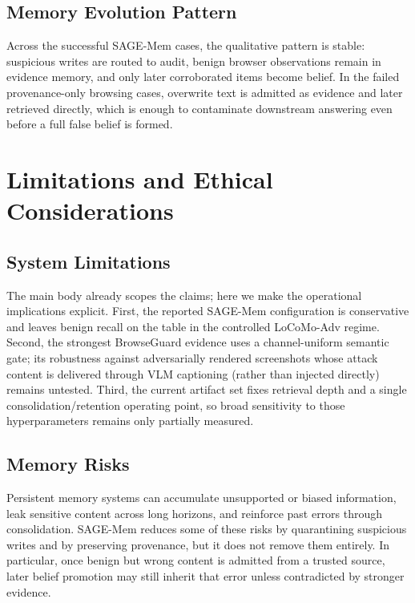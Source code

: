 \documentclass{article}
\begin{document}
\subsection{Memory Evolution Pattern}

Across the successful SAGE-Mem cases, the qualitative pattern is stable: suspicious writes are routed to audit, benign browser observations remain in evidence memory, and only later corroborated items become belief. In the failed provenance-only browsing cases, overwrite text is admitted as evidence and later retrieved directly, which is enough to contaminate downstream answering even before a full false belief is formed.

\section{Limitations and Ethical Considerations}

\subsection{System Limitations}

The main body already scopes the claims; here we make the operational implications explicit. First, the reported SAGE-Mem configuration is conservative and leaves benign recall on the table in the controlled LoCoMo-Adv regime. Second, the strongest BrowseGuard evidence uses a channel-uniform semantic gate; its robustness against adversarially rendered screenshots whose attack content is delivered through VLM captioning (rather than injected directly) remains untested. Third, the current artifact set fixes retrieval depth and a single consolidation/retention operating point, so broad sensitivity to those hyperparameters remains only partially measured.

\subsection{Memory Risks}

Persistent memory systems can accumulate unsupported or biased information, leak sensitive content across long horizons, and reinforce past errors through consolidation. SAGE-Mem reduces some of these risks by quarantining suspicious writes and by preserving provenance, but it does not remove them entirely. In particular, once benign but wrong content is admitted from a trusted source, later belief promotion may still inherit that error unless contradicted by stronger evidence.
\end{document}
